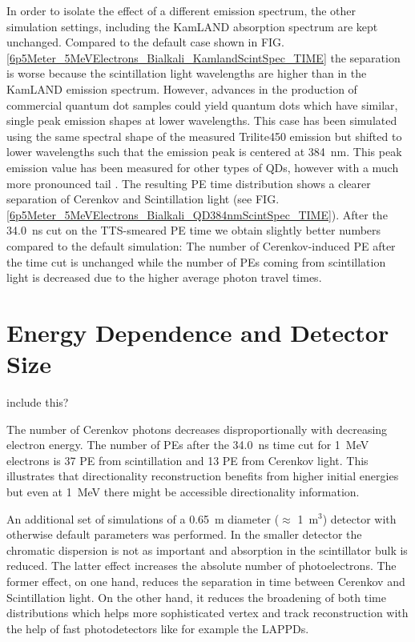 \documentclass[aps,prc,twocolumn,groupedaddress,showpacs,amsmath,amssymb,floatfix,superscriptaddress]{revtex4}
\begin{document}
In order to isolate the effect of a different emission spectrum, the other simulation settings, including the KamLAND absorption spectrum are kept unchanged. Compared to the default case shown in FIG. \ref{6p5Meter_5MeVElectrons_Bialkali_KamlandScintSpec_TIME} the separation is worse because the scintillation light wavelengths are higher than in the KamLAND emission spectrum. However, advances in the production of commercial quantum dot samples could yield quantum dots which have similar, single peak emission shapes at lower wavelengths. This case has been simulated using the same spectral shape of the measured Trilite450 emission but shifted to lower wavelengths such that the emission peak is centered at 384~nm. This peak emission value has been measured for other types of QDs, however with a much more pronounced tail \cite{tbd}. The resulting PE time distribution shows a clearer separation of Cerenkov and Scintillation light (see FIG. \ref{6p5Meter_5MeVElectrons_Bialkali_QD384nmScintSpec_TIME}). After the 34.0~ns cut on the TTS-smeared PE time we obtain slightly better numbers compared to the default simulation: The number of Cerenkov-induced PE after the time cut is unchanged while the number of PEs coming from scintillation light is decreased due to the higher average photon travel times.  

\section{Energy Dependence and Detector Size}
\label{edep_size_sec}
include this? 

The number of Cerenkov photons decreases disproportionally with decreasing electron energy. The number of PEs after the 34.0~ns time cut for 1~MeV electrons is 37 PE from scintillation and 13 PE from Cerenkov light. This illustrates that directionality reconstruction benefits from higher initial energies but even at 1~MeV there might be accessible directionality information.  

An additional set of simulations of a 0.65~m diameter ($\approx$ 1~m$^3$) detector with otherwise default parameters was performed. In the smaller detector the chromatic dispersion is not as important and absorption in the scintillator bulk is reduced. The latter effect increases the absolute number of photoelectrons. The former effect, on one hand, reduces the separation in time between Cerenkov and Scintillation light. On the other hand, it reduces the broadening of both time distributions which helps more sophisticated vertex and track reconstruction with the help of fast photodetectors like for example the LAPPDs. 
\end{document}

